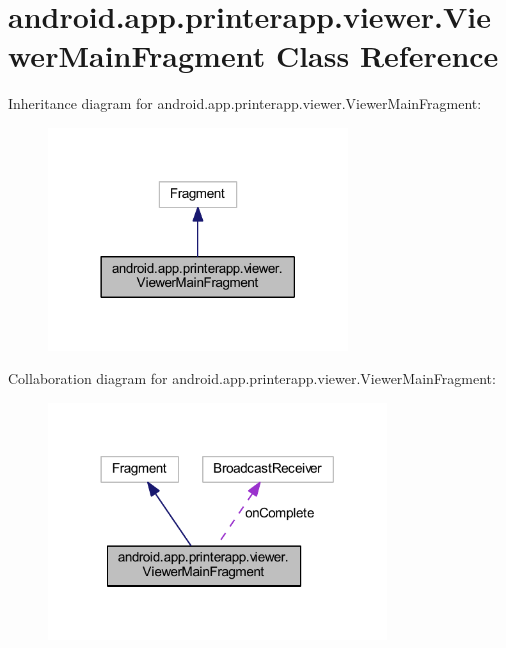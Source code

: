 \hypertarget{classandroid_1_1app_1_1printerapp_1_1viewer_1_1_viewer_main_fragment}{}\section{android.\+app.\+printerapp.\+viewer.\+Viewer\+Main\+Fragment Class Reference}
\label{classandroid_1_1app_1_1printerapp_1_1viewer_1_1_viewer_main_fragment}


Inheritance diagram for android.\+app.\+printerapp.\+viewer.\+Viewer\+Main\+Fragment\+:
\nopagebreak
\begin{figure}[H]
\begin{center}
\leavevmode
\includegraphics[width=225pt]{classandroid_1_1app_1_1printerapp_1_1viewer_1_1_viewer_main_fragment__inherit__graph}
\end{center}
\end{figure}


Collaboration diagram for android.\+app.\+printerapp.\+viewer.\+Viewer\+Main\+Fragment\+:
\nopagebreak
\begin{figure}[H]
\begin{center}
\leavevmode
\includegraphics[width=254pt]{classandroid_1_1app_1_1printerapp_1_1viewer_1_1_viewer_main_fragment__coll__graph}
\end{center}
\end{figure}

